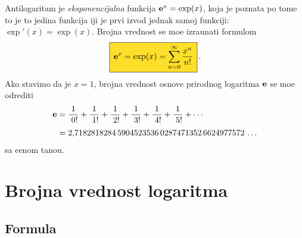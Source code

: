 \documentclass[12pt, twoside, a4paper]{article}
\def\.{\smash{,}\vphantom{.}}
\def\e{{\bf e}}
\def\okvir#1{\,\fcolorbox{black}{Goldenrod}{$\,\displaystyle{\mathstrut #1}\,$}\,}
\begin{document}
\def\ep{\hphantom{!}}
\def\rf#1!{\frac1{\hphantom{!}#1!}}
Antilogaritam je {\sl eksponencijalna\/} funkcija $\e^x=\exp(x)$, koja je poznata po tome {\sv}to je to 
jedina funkcija {\cv}iji je prvi izvod jednak samoj funkciji: $\exp'(x)=\exp(x)$. Brojna vrednost se mo{\zv}e
izra{\cv}unati formulom
\begin{equation}
\label{eq:exp}
\okvir{\e^x=\exp(x)=\sum_{n=0}^\infty\frac{x^n}{n!}}.
\end{equation}
Ako stavimo da je $x=1$,
brojna vrednost osnove prirodnog logaritma $\e$ se mo{\zv}e odrediti
\begin{equation}\label{eq:e}
\begin{split}
\e
&=\rf0!+\rf1!+\rf2!+\rf3!+\rf4!+\rf5!+\cdots\\
\noalign{\smallskip}
&=2\.
7182818284\,
5904523536\,
0287471352\,
6624977572\,\ldots
\end{split}
\end{equation}
sa {\zv}e{\lj}enom ta{\cv}no{\sv}{\cc}u.


\section{Brojna vrednost logaritma}

\subsection{Formula}
\end{document}

